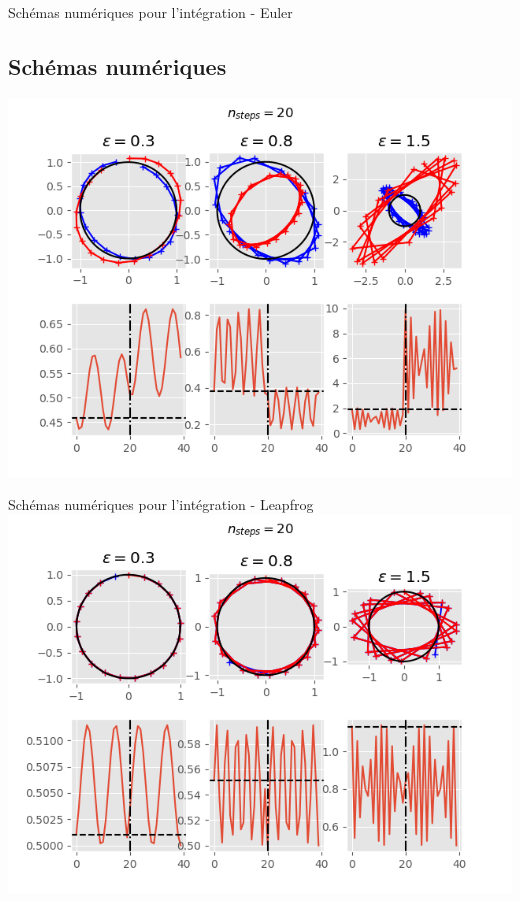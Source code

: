 \documentclass{beamer}
\begin{document}
\begin{frame}{Schémas numériques pour l'intégration - Euler}
\subsection{Schémas numériques}
\centering
\includegraphics[width=.9\linewidth]{samples/euler_example.png}
\end{frame}

\begin{frame}{Schémas numériques pour l'intégration - Leapfrog}
\centering
\includegraphics[width=.9\linewidth]{samples/leapfrog_example.png}
\end{frame}
\end{document}
